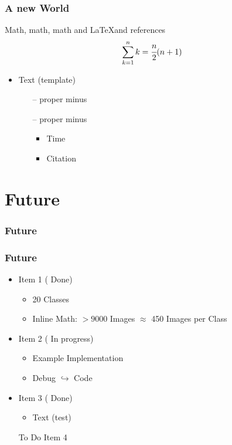 \documentclass{beamer}
\begin{document}
\begin{frame}
    \frametitle{A new World}
    Math, math, math and \LaTeX and references
    \begin{equation}
      \sum_{k=1}^{n}{k} = \cfrac{n}{2}(n+1)
    \end{equation}

    \begin{itemize}
      \item Text (template)
      \begin{itemize}
        \item [\color{red}--] proper minus
        \item [\color{red}--] proper minus
        \begin{itemize}
          \item Time
          \item Citation \cite{martin1997island}
        \end{itemize}
      \end{itemize}
    \end{itemize}
\end{frame}

\section{Future}
\begin{frame}
\frametitle{Future}

\end{frame}

\begin{frame}
\frametitle{Future}
  \begin{itemize}
    \item Item 1 (\color{blue} Done\color{black})
    \begin{itemize}
      \item 20 Classes
      \item Inline Math: $> 9000$ Images $\approx$ 450 Images per Class
    \end{itemize}
    \item Item 2 (\color{orange} In progress\color{black})
    \begin{itemize}
      \item Example Implementation
      \item Debug $\hookrightarrow$ Code
    \end{itemize}
    \item Item 3 (\color{blue} Done\color{black})
    \begin{itemize}
      \item Text (test)
    \end{itemize}
    \item [To Do] Item 4
  \end{itemize}
\end{frame}
\end{document}
